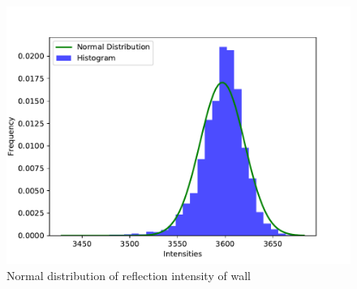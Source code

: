   \begin{figure}[h]
    \centering
    \includegraphics[keepaspectratio, scale=0.50] {images/pdf/RobotGuidance_plot_reflection_intensities_of_wall}
    \captionsetup{justification=raggedright} %
    \caption{Normal distribution of reflection intensity of wall}
    \label{Fig:Normal distribution of reflection intensity of wall}
  \end{figure}

\newpage